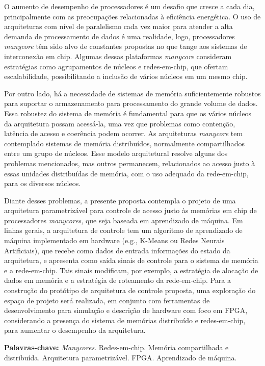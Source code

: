\begin{resumo}
\vspace{0.4cm}
\onehalfspacing

\noindent 
O aumento de desempenho de processadores é um desafio que cresce a cada dia, principalmente com as preocupações relacionadas à eficiência energética.
O uso de arquiteturas com nível de paralelismo cada vez maior para atender a alta demanda de processamento de dados é uma realidade, logo, processadores \textit{manycore} têm sido alvo de constantes propostas no que tange aos sistemas de interconexão em chip.
Algumas dessas plataformas \textit{manycore} consideram estratégias como agrupamentos de núcleos e redes-em-chip, que ofertam escalabilidade, possibilitando a inclusão de vários núcleos em um mesmo chip.

Por outro lado, há a necessidade de sistemas de memória suficientemente robustos para suportar o armazenamento para processamento do grande volume de dados.
Essa robustez do sistema de memória é fundamental para que os vários núcleos da arquitetura possam acessá-la, uma vez que problemas como contenção, latência de acesso e coerência podem ocorrer.
As arquiteturas \textit{manycore} tem contemplado sistemas de memória distribuídos, normalmente compartilhados entre um grupo de núcleos.
Esse modelo arquitetural resolve alguns dos problemas mencionados, mas outros permanecem, relacionados ao acesso justo à essas unidades distribuídas de memória, com o uso adequado da rede-em-chip, para os diversos núcleos.

Diante desses problemas, a presente proposta contempla o projeto de uma arquitetura parametrizável para controle de acesso justo às memórias em chip de processadores \textit{manycores}, que seja baseada em aprendizado de máquina.
Em linhas gerais, a arquitetura de controle tem um algoritmo de aprendizado de máquina implementado em hardware (e.g., K-Means ou Redes Neurais Artificiais), que recebe como dados de entrada informações do estado da arquitetura, e apresenta como saída sinais de controle para o sistema de memória e a rede-em-chip.
Tais sinais modificam, por exemplo, a estratégia de alocação de dados em memória e a estratégia de roteamento da rede-em-chip.
Para a construção do protótipo de arquitetura de controle proposta, uma exploração do espaço de projeto será realizada, em conjunto com ferramentas de desenvolvimento para simulação e descrição de hardware com foco em FPGA, considerando a presença do sistema de memórias distribuído e redes-em-chip, para aumentar o desempenho da arquitetura.

\vspace*{.50cm}
\noindent \textbf{Palavras-chave:} \textit{Manycores}. Redes-em-chip. Memória compartilhada e distribuída. Arquitetura parametrizável. FPGA. Aprendizado de máquina.\\
\end{resumo}